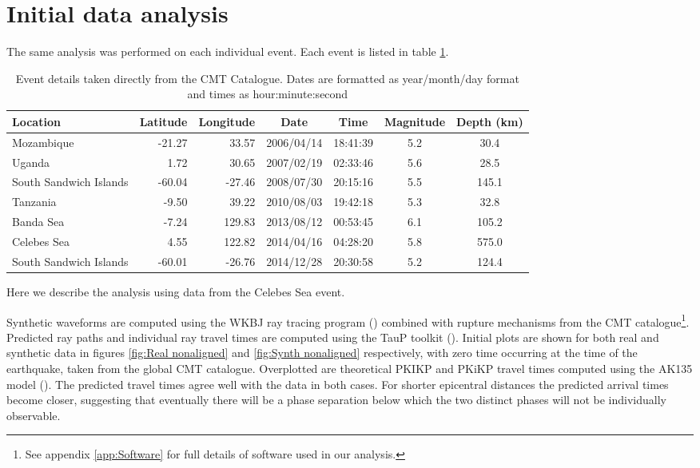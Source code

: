\documentclass[11pt,a4paper]{article}
\begin{document}
\section{Initial data analysis}
\label{sec:Initial analysis}
The same analysis was performed on each individual event. Each event is listed in table \ref{tab:Events}.
\begin{table}\footnotesize
\centering
\begin{tabular}{| l | r | r | c | c | c | c |}
	\hline Location				& Latitude	& Longitude	& Date		& Time		& Magnitude	& Depth (km) 	\\ \hline
	\hline Mozambique			& -21.27	& 33.57		& 2006/04/14	& 18:41:39	& 5.2			& 30.4		\\
	\hline Uganda				& 1.72	& 30.65		& 2007/02/19	& 02:33:46	& 5.6			& 28.5		\\
	\hline South Sandwich Islands	& -60.04	& -27.46		& 2008/07/30	& 20:15:16	& 5.5			& 145.1		\\
	\hline Tanzania				& -9.50	& 39.22		& 2010/08/03	& 19:42:18	& 5.3			& 32.8		\\
	\hline Banda Sea			& -7.24	& 129.83		& 2013/08/12	& 00:53:45	& 6.1			& 105.2		\\
	\hline Celebes Sea			& 4.55	& 122.82		& 2014/04/16	& 04:28:20	& 5.8			& 575.0  		\\ 
	\hline South Sandwich Islands 	& -60.01	& -26.76		& 2014/12/28	& 20:30:58	& 5.2			& 124.4		\\
	\hline	
\end{tabular}
\caption{Event details taken directly from the CMT Catalogue. Dates are formatted as year/month/day format and times as hour:minute:second}
\label{tab:Events}
\end{table}
Here we describe the analysis using data from the Celebes Sea event.

Synthetic waveforms are computed using the WKBJ ray tracing program (\cite{Chapman1976}) combined with rupture mechanisms from the CMT catalogue\footnote{See appendix \ref{app:Software} for full details of software used in our analysis.}. Predicted ray paths and individual ray travel times are computed using the TauP toolkit (\cite{Crotwell1999}). Initial plots are shown for both real and synthetic data in figures \ref{fig:Real nonaligned} and \ref{fig:Synth nonaligned} respectively, with zero time occurring at the time of the earthquake, taken from the global CMT catalogue. Overplotted are theoretical PKIKP and PKiKP travel times computed using the AK135 model (\cite{Kennett1995b}). The predicted travel times agree well with the data in both cases.  For shorter epicentral distances the predicted arrival times become closer, suggesting that eventually there will be a phase separation below which the two distinct phases will not be individually observable.
\end{document}
